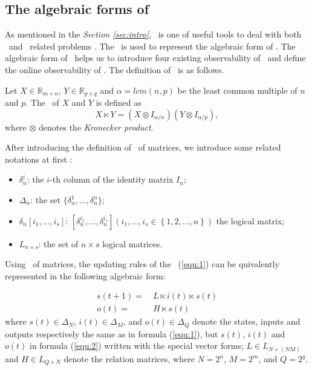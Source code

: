 \subsection{The algebraic forms of \BCNs}
As mentioned in the {\em Section \ref{sec:intro}}, \STP\ is one of useful tools to deal with  both \BNs\ and \BCNs\  related problems \cite{cheng2009controllability}. The \STP\ is used to represent the algebraic form of \BCN. The algebraic form of \BCN\ helps us to introduce four existing observability of \BCN\ and define the online observability of \BCN. The definition of \STP\ is as follows.

\begin{definition}[STP] 
	\cite{Cheng2011Analysis} Let $X\in\mathbb{R}_{m\times n}$, $Y\in\mathbb{R}_{p\times q}$ and $\alpha=lcm(n,p)$ be the least common multiple of $n$ and $p$. The \STP\ of $X$ and $Y$ is defined as \[X\ltimes Y=(X\otimes I_{\alpha/n})(Y\otimes I_{\alpha/p}),\] where $\otimes$ denotes the {\em Kronecker product}. 
\end{definition}

After introducing the definition of \STP\ of matrices,  we introduce some related notations at first \cite{Zhang2016Observability}:
\begin{itemize}
  \item $\delta^i_n$: the $i$-th column of the identity matrix $I_n$;
  \item $\Delta_n$: the set $\{\delta^1_n,\ldots,\delta^n_n \}$; 
  \item $\delta_n \left[i_1,\ldots,i_s\right]$: $\left[\delta^{i_1}_n,\ldots,\delta^{i_s}_n\right]\left(i_1,\ldots,i_s\in\left\{1,2,\ldots,n\right\}\right)$ the logical matrix;
  \item  $L_{n\times s}$: the set of $n\times s$ logical matrices.
\end{itemize}

Using \STP\ of matrices, the updating rules of the \BCN\ (\ref{equ:1}) can be quivalently represented in the following algebraic form:
\begin{definition}

\begin{equation}
\begin{split}
s(t+1)=&\ L\ltimes{i(t)}\ltimes{s(t)}\\
o(t)=&\ H\ltimes{s(t)}
\end{split}
\label{equ:2}
\end{equation}
where $s(t)\in\Delta_N$, $i(t)\in\Delta_M$, and  $o(t)\in\Delta_Q$ denote the states, inputs and outputs respectively the same as in formula (\ref{equ:1}), but $s(t)$, $i(t)$ and $o(t)$ in formula (\ref{equ:2}) written with the special vector forms; $L\in L_{N\times\left(NM\right)}$ and $H\in L_{Q\times N}$ denote the relation matrices, where $N=2^n$, $M=2^m$, and $Q=2^q$. 
\end{definition}

